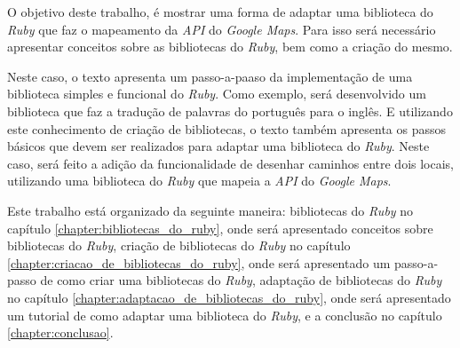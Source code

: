 O objetivo deste trabalho, é mostrar uma forma de adaptar uma biblioteca do \emph{Ruby} que
faz o mapeamento da \emph{API} do \emph{Google Maps}. Para isso será necessário apresentar
conceitos sobre as bibliotecas do \emph{Ruby}, bem como a criação do mesmo.

Neste caso, o texto apresenta um passo-a-paaso da implementação de uma biblioteca simples
e funcional do \emph{Ruby}. Como exemplo, será desenvolvido um biblioteca que faz a
tradução de palavras do português para o inglês. E utilizando este conhecimento de criação
de bibliotecas, o texto também apresenta os passos básicos que devem ser realizados
para adaptar uma biblioteca do \emph{Ruby}. Neste caso, será feito a adição da
funcionalidade de desenhar caminhos entre dois locais, utilizando uma biblioteca do
\emph{Ruby} que mapeia a \emph{API} do \emph{Google Maps}. 

Este trabalho está organizado da seguinte maneira: bibliotecas do \emph{Ruby} no
capítulo \ref{chapter:bibliotecas_do_ruby}, onde será apresentado conceitos sobre
bibliotecas do \emph{Ruby}, criação de bibliotecas do \emph{Ruby} no capítulo 
\ref{chapter:criacao_de_bibliotecas_do_ruby}, onde será apresentado um passo-a-passo
de como criar uma bibliotecas do \emph{Ruby}, adaptação de bibliotecas do \emph{Ruby}
no capítulo  \ref{chapter:adaptacao_de_bibliotecas_do_ruby}, onde será apresentado um
tutorial de como adaptar uma biblioteca do \emph{Ruby}, e a conclusão no capítulo
\ref{chapter:conclusao}.